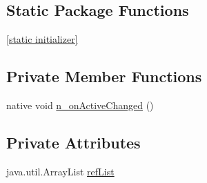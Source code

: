 \subsection*{Static Package Functions}
\begin{CompactItemize}
\item 
\hyperlink{classmono_1_1android_1_1support_1_1v4_1_1media_1_1session_1_1_media_session_compat___on_active_change_listener_implementor_e6ad0c46356a393fb68c3b115bd6a26b}{\mbox{[}static initializer\mbox{]}}
\end{CompactItemize}
\subsection*{Private Member Functions}
\begin{CompactItemize}
\item 
native void \hyperlink{classmono_1_1android_1_1support_1_1v4_1_1media_1_1session_1_1_media_session_compat___on_active_change_listener_implementor_7350c52e09d93ef45b82bd10e5bb94c2}{n\_\-onActiveChanged} ()
\end{CompactItemize}
\subsection*{Private Attributes}
\begin{CompactItemize}
\item 
java.util.ArrayList \hyperlink{classmono_1_1android_1_1support_1_1v4_1_1media_1_1session_1_1_media_session_compat___on_active_change_listener_implementor_ac22d676a4da9a5ed6ab94314943f6ca}{refList}
\end{CompactItemize}


